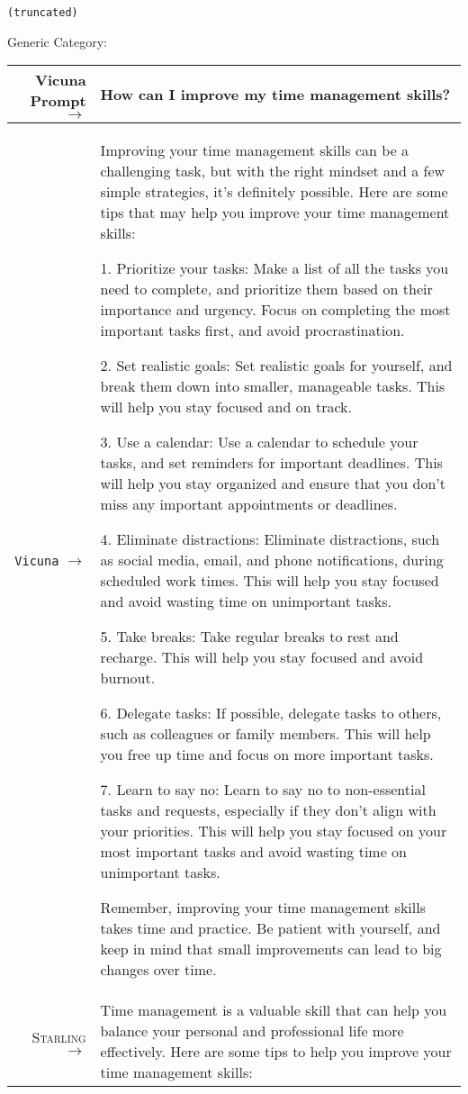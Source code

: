 \documentclass{article}
\newlength\mydepth
\newcommand{\starlingemojititle}{\textsc{Starling}\raisebox{-\mydepth}{\texttt{[image: images/starling-final.png]}}}
\begin{document}
{\begin{lstlisting}[upquote=true]
(truncated)
\end{lstlisting}
 
\newpage

Generic Category:

{  \footnotesize \begin{tabularx}{\linewidth}{r X} \toprule Vicuna Prompt $\to$ & {\bf How can I improve my time management skills?}
\\
 \midrule \texttt{Vicuna} $\to$ &
Improving your time management skills can be a challenging task, but with the right mindset and a few simple strategies, it's definitely possible. Here are some tips that may help you improve your time management skills:

1. Prioritize your tasks: Make a list of all the tasks you need to complete, and prioritize them based on their importance and urgency. Focus on completing the most important tasks first, and avoid procrastination.

2. Set realistic goals: Set realistic goals for yourself, and break them down into smaller, manageable tasks. This will help you stay focused and on track.

3. Use a calendar: Use a calendar to schedule your tasks, and set reminders for important deadlines. This will help you stay organized and ensure that you don't miss any important appointments or deadlines.

4. Eliminate distractions: Eliminate distractions, such as social media, email, and phone notifications, during scheduled work times. This will help you stay focused and avoid wasting time on unimportant tasks.

5. Take breaks: Take regular breaks to rest and recharge. This will help you stay focused and avoid burnout.

6. Delegate tasks: If possible, delegate tasks to others, such as colleagues or family members. This will help you free up time and focus on more important tasks.

7. Learn to say no: Learn to say no to non-essential tasks and requests, especially if they don't align with your priorities. This will help you stay focused on your most important tasks and avoid wasting time on unimportant tasks.

Remember, improving your time management skills takes time and practice. Be patient with yourself, and keep in mind that small improvements can lead to big changes over time.
\\
 \midrule \starlingemojititle{} $\to$ &
Time management is a valuable skill that can help you balance your personal and professional life more effectively. Here are some tips to help you improve your time management skills:


\end{tabularx}}}
\end{document}

